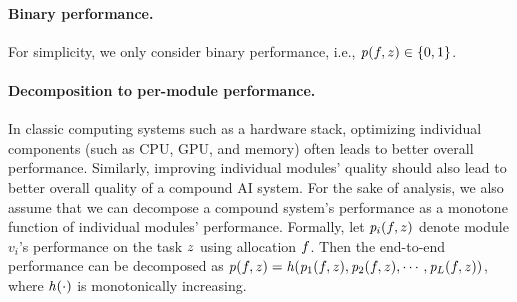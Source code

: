 \paragraph{Binary performance.}  For simplicity, we only consider binary performance, i.e., $\mathit{p} (f,z)\in \{0,1\}$.

\paragraph{Decomposition to per-module performance.} In classic computing systems such as a hardware stack, optimizing individual components (such as CPU, GPU, and memory) often leads to better overall performance. Similarly, improving individual modules' quality should also lead to better overall quality of a compound AI system. For the sake of analysis, we also assume that we can decompose a compound system's performance as a monotone function of individual modules' performance. Formally, let $\mathit{p}_i(f, z)$ denote module $v_i$'s performance on the task $z$ using allocation $f$. Then the end-to-end performance can be decomposed as $\mathit{p}(f,z) = \mathit{h}(\mathit{p}_1(f,z),\mathit{p}_2(f,z),\cdots, \mathit{p}_L(f,z))$, where $\mathit{h}(\cdot)$ is monotonically increasing. 

